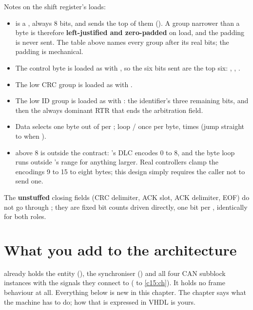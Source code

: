 Notes on the shift register's loads:
\begin{itemize}
  \item {} is a , always 8 bits, and sends the top
     of them (). A group narrower than a byte is therefore
    \textbf{left-justified and zero-padded} on load, and the padding is never sent. The table above
    names every group after its real bits; the padding is mechanical.
  \item The control byte is loaded as  with , so the
    six bits sent are the top six: , , .
  \item The low CRC group is loaded as  with .
  \item The low ID group is loaded as  with
    : the identifier's three remaining bits, and then the always dominant RTR
    that ends the arbitration field.
  \item Data selects one byte out of  per ; loop
    / once per byte,  times (jump straight to
     when ).
  \item {} above 8 is outside the contract: 's DLC encodes 0
    to 8, and the byte loop runs outside 's range for anything larger. Real
    controllers clamp the encodings 9 to 15 to eight bytes; this design simply requires the caller not
    to send one.
\end{itemize}

The \textbf{unstuffed} closing fields (CRC delimiter, ACK slot, ACK delimiter, EOF) do not go through
; they are fixed bit counts driven directly, one bit per
, identically for both roles.

\section{What you add to the architecture}
\label{c16:sec:declare}

 already holds the entity (), the 
synchroniser () and all four CAN subblock instances with the signals they connect to
( to \ref{c15:ch}). It holds no frame behaviour at all. Everything below is new in
this chapter. The chapter says what the machine has to do; how that is expressed in VHDL is yours.

